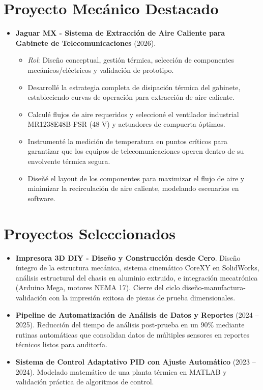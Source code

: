 \documentclass[10pt,letterpaper]{article}
\newcommand{\CVItem}[1]{\item #1}
\begin{document}
\section*{Proyecto Mecánico Destacado}
\begin{itemize}[leftmargin=*, itemsep=0.5ex]
    \item \textbf{Jaguar MX - Sistema de Extracción de Aire Caliente para Gabinete de Telecomunicaciones} (2026).
    \begin{itemize}[itemsep=0.1ex]
        \item \textit{Rol}: Diseño conceptual, gestión térmica, selección de componentes mecánicos/eléctricos y validación de prototipo.
        \item Desarrollé la estrategia completa de disipación térmica del gabinete, estableciendo curvas de operación para extracción de aire caliente.
        \item Calculé flujos de aire requeridos y seleccioné el ventilador industrial MR1238E48B-FSR (48 V) y actuadores de compuerta óptimos.
        \item Instrumenté la medición de temperatura en puntos críticos para garantizar que los equipos de telecomunicaciones operen dentro de su envolvente térmica segura.
        \item Diseñé el layout de los componentes para maximizar el flujo de aire y minimizar la recirculación de aire caliente, modelando escenarios en software.
    \end{itemize}
\end{itemize}

\section*{Proyectos Seleccionados}
\begin{itemize}[leftmargin=*, itemsep=0.2ex]
    \CVItem{\textbf{Impresora 3D DIY - Diseño y Construcción desde Cero}. Diseño íntegro de la estructura mecánica, sistema cinemático CoreXY en SolidWorks, análisis estructural del chasis en aluminio extruido, e integración mecatrónica (Arduino Mega, motores NEMA 17). Cierre del ciclo diseño-manufactura-validación con la impresión exitosa de piezas de prueba dimensionales.}
    \CVItem{\textbf{Pipeline de Automatización de Análisis de Datos y Reportes} (2024 -- 2025). Reducción del tiempo de análisis post-prueba en un 90\% mediante rutinas automáticas que consolidan datos de múltiples sensores en reportes técnicos listos para auditoría.}
    \CVItem{\textbf{Sistema de Control Adaptativo PID con Ajuste Automático} (2023 -- 2024). Modelado matemático de una planta térmica en MATLAB y validación práctica de algoritmos de control.}
\end{itemize}
\end{document}
